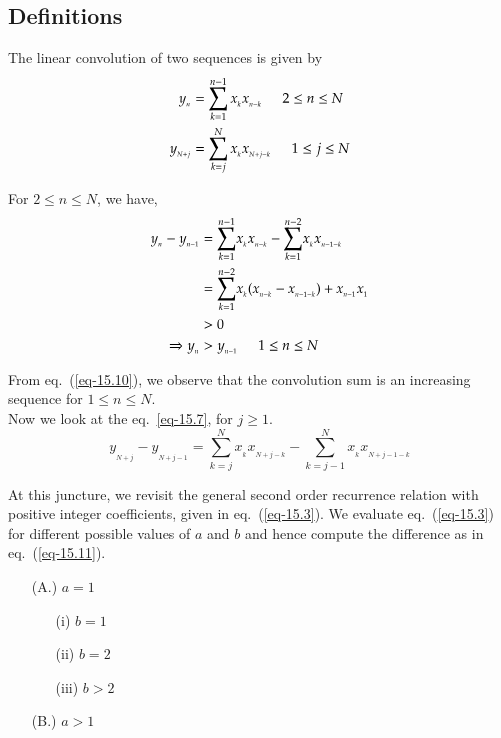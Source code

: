 \begin{multicols}{2}
\subsection{Definitions}\label{subsection-15.2}
The linear convolution of two sequences is given by
\begin{align}
y_{_n} &= \displaystyle{\sum_{k=1}^{n-1}x_{_k} x_{_{n-k}}} \hspace{0.2in} 2 \leq n\leq N\label{eq-15.6}\\
y_{_{N+j}} &= \displaystyle{\sum_{k=j}^{N}x_{_k} x_{_{N+j-k}}} \hspace{0.2in} 1 \leq j \leq N\label{eq-15.7}
\end{align}

For $2\leq n \leq N$, we have,
\begin{align}
y_{_n} - y_{_{n-1}} &= \displaystyle{\sum_{k=1}^{n-1}}x_{_k}x_{_{n-k}} -  \displaystyle{\sum_{k=1}^{n-2}}x_{_k}x_{_{n-1-k}}\label{eq-15.8}\\
&= \displaystyle{\sum_{k=1}^{n-2}}x_{_k} (x_{_{n-k}}-x_{_{n-1-k}} )+ x_{_{n-1}}x_{_1}\label{eq-15.9}\\
& >  0 \nonumber\\
\Rightarrow y_{_n} &> y_{_{n-1}} \hspace{0.2in} 1\leq n \leq N\label{eq-15.10}
\end{align}

From eq.~(\ref{eq-15.10}), we observe that the convolution sum is an increasing sequence for $1\leq n\leq N$.\\
Now we look at the eq.~\ref{eq-15.7}, for $j\geq 1$. 
\begin{equation}
y_{_{N+j}} - y_{_{N+j-1}} = \displaystyle{\sum_{k=j}^{N}}x_{_{k}}x_{_{N+j-k}} -  \displaystyle{\sum_{k=j-1}^{N}}x_{_k}x_{_{N+j-1-k}}\label{eq-15.11}
\end{equation}

\vspace{-.3cm}

At this juncture, we revisit the general second order recurrence relation with positive integer coefficients, given in eq.~(\ref{eq-15.3}). We evaluate eq.~(\ref{eq-15.3}) for different possible values of $a$ and $b$ and hence compute the difference as in eq.~(\ref{eq-15.11}).

\vspace{-.3cm}

\begin{itemize}
\item [(A.)] $a = 1$
	\begin{itemize}
	\item [(i)]  $b = 1$
	\item [(ii)] $b = 2$
	\item [(iii)]$b > 2$
	\end{itemize}
\item [(B.)] $a >1$
\end{itemize}


\end{multicols}
